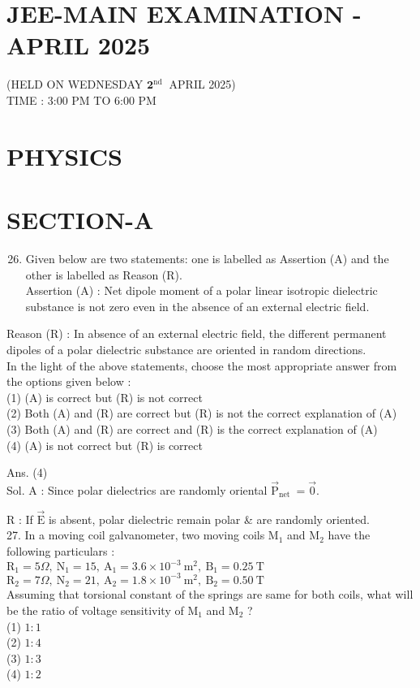 \documentclass[10pt]{article}
\begin{document}
\section*{JEE-MAIN EXAMINATION - APRIL 2025}
(HELD ON WEDNESDAY \(\mathbf{2}^{\text {nd }}\) APRIL 2025)\\
TIME : 3:00 PM TO 6:00 PM

\section*{PHYSICS}
\section*{SECTION-A}
\begin{enumerate}
  \setcounter{enumi}{25}
  \item Given below are two statements: one is labelled as Assertion (A) and the other is labelled as Reason (R).\\
Assertion (A) : Net dipole moment of a polar linear isotropic dielectric substance is not zero even in the absence of an external electric field.
\end{enumerate}

Reason (R) : In absence of an external electric field, the different permanent dipoles of a polar dielectric substance are oriented in random directions.\\
In the light of the above statements, choose the most appropriate answer from the options given below :\\
(1) (A) is correct but (R) is not correct\\
(2) Both (A) and (R) are correct but (R) is not the correct explanation of (A)\\
(3) Both (A) and (R) are correct and (R) is the correct explanation of (A)\\
(4) (A) is not correct but (R) is correct

Ans. (4)\\
Sol. A : Since polar dielectrics are randomly oriental \(\overrightarrow{\mathrm{P}}_{\text {net }}=\overrightarrow{0}\).

R : If \(\overrightarrow{\mathrm{E}}\) is absent, polar dielectric remain polar \& are randomly oriented.\\
27. In a moving coil galvanometer, two moving coils \(\mathrm{M}_{1}\) and \(\mathrm{M}_{2}\) have the following particulars :\\
\(\mathrm{R}_{1}=5 \Omega, \mathrm{~N}_{1}=15, \mathrm{~A}_{1}=3.6 \times 10^{-3} \mathrm{~m}^{2}, \mathrm{~B}_{1}=0.25 \mathrm{~T}\)\\
\(\mathrm{R}_{2}=7 \Omega, \mathrm{~N}_{2}=21, \mathrm{~A}_{2}=1.8 \times 10^{-3} \mathrm{~m}^{2}, \mathrm{~B}_{2}=0.50 \mathrm{~T}\)\\
Assuming that torsional constant of the springs are same for both coils, what will be the ratio of voltage sensitivity of \(\mathrm{M}_{1}\) and \(\mathrm{M}_{2}\) ?\\
(1) \(1: 1\)\\
(2) \(1: 4\)\\
(3) \(1: 3\)\\
(4) \(1: 2\)
\end{document}
